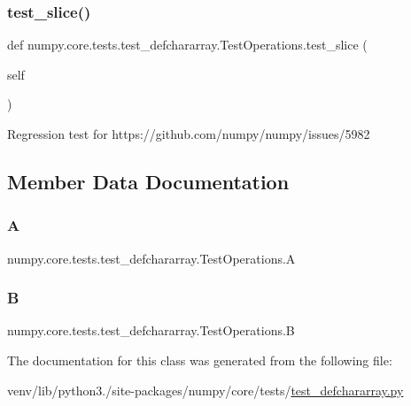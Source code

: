 \subsubsection{\texorpdfstring{test\+\_\+slice()}{test\_slice()}}
{\footnotesize\ttfamily def numpy.\+core.\+tests.\+test\+\_\+defchararray.\+Test\+Operations.\+test\+\_\+slice (\begin{DoxyParamCaption}\item[{}]{self }\end{DoxyParamCaption})}

\begin{DoxyVerb}Regression test for https://github.com/numpy/numpy/issues/5982\end{DoxyVerb}
 

\subsection{Member Data Documentation}
\mbox{\label{classnumpy_1_1core_1_1tests_1_1test__defchararray_1_1TestOperations_aff00437f66ae7cbf1dce9debfe65dd62}} 
\subsubsection{\texorpdfstring{A}{A}}
{\footnotesize\ttfamily numpy.\+core.\+tests.\+test\+\_\+defchararray.\+Test\+Operations.\+A}

\mbox{\label{classnumpy_1_1core_1_1tests_1_1test__defchararray_1_1TestOperations_a6e9d6db3830b395679000ed9aa284376}} 
\subsubsection{\texorpdfstring{B}{B}}
{\footnotesize\ttfamily numpy.\+core.\+tests.\+test\+\_\+defchararray.\+Test\+Operations.\+B}



The documentation for this class was generated from the following file\+:\begin{DoxyCompactItemize}
\item 
venv/lib/python3./site-\/packages/numpy/core/tests/\hyperlink{test__defchararray_8py}{test\+\_\+defchararray.\+py}\end{DoxyCompactItemize}
